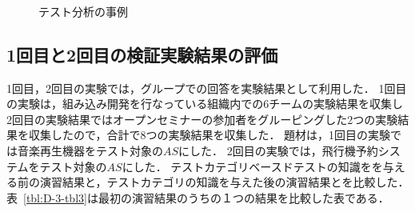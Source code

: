 \begin{figure}[H]
\centering
{}
\\
\\
\\
\caption{テスト分析の事例}
\label{fig:D-3-Fig1-1234}
\end{figure}


\subsection{1回目と2回目の検証実験結果の評価}
1回目，2回目の実験では，グループでの回答を実験結果として利用した．
1回目の実験は，組み込み開発を行なっている組織内での6チームの実験結果を収集し
2回目の実験結果ではオープンセミナーの参加者をグルーピングした2つの実験結果を収集したので，合計で8つの実験結果を収集した．
題材は，1回目の実験では音楽再生機器をテスト対象の$AS$にした．
2回目の実験では，飛行機予約システムをテスト対象の$AS$にした．
テストカテゴリベースドテストの知識をを与える前の演習結果と，テストカテゴリの知識を与えた後の演習結果とを比較した．
表~\ref{tbl:D-3-tbl3}は最初の演習結果のうちの１つの結果を比較した表である．

